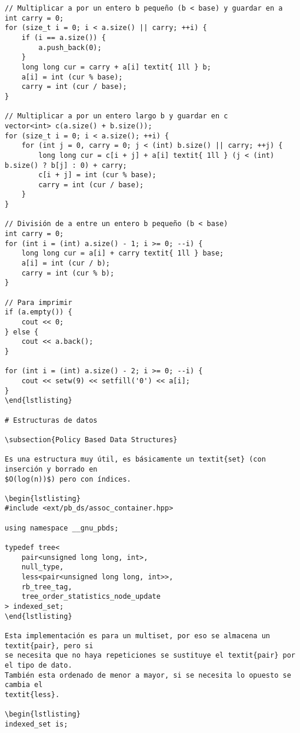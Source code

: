 \documentclass[11pt]{article}
\begin{document}
\begin{verbatim}
// Multiplicar a por un entero b pequeño (b < base) y guardar en a
int carry = 0;
for (size_t i = 0; i < a.size() || carry; ++i) {
    if (i == a.size()) {
        a.push_back(0);
    }
    long long cur = carry + a[i] textit{ 1ll } b;
    a[i] = int (cur % base);
    carry = int (cur / base);
}

// Multiplicar a por un entero largo b y guardar en c
vector<int> c(a.size() + b.size());
for (size_t i = 0; i < a.size(); ++i) {
    for (int j = 0, carry = 0; j < (int) b.size() || carry; ++j) {
        long long cur = c[i + j] + a[i] textit{ 1ll } (j < (int) b.size() ? b[j] : 0) + carry;
        c[i + j] = int (cur % base);
        carry = int (cur / base);
    }
}

// División de a entre un entero b pequeño (b < base)
int carry = 0;
for (int i = (int) a.size() - 1; i >= 0; --i) {
    long long cur = a[i] + carry textit{ 1ll } base;
    a[i] = int (cur / b);
    carry = int (cur % b);
}

// Para imprimir
if (a.empty()) {
    cout << 0;
} else {
    cout << a.back();
}
        
for (int i = (int) a.size() - 2; i >= 0; --i) {
    cout << setw(9) << setfill('0') << a[i];
}
\end{lstlisting}

# Estructuras de datos

\subsection{Policy Based Data Structures}

Es una estructura muy útil, es básicamente un textit{set} (con inserción y borrado en
$O(log(n))$) pero con índices.

\begin{lstlisting}
#include <ext/pb_ds/assoc_container.hpp>

using namespace __gnu_pbds;

typedef tree<
    pair<unsigned long long, int>,
    null_type,
    less<pair<unsigned long long, int>>,
    rb_tree_tag,
    tree_order_statistics_node_update
> indexed_set;
\end{lstlisting}

Esta implementación es para un multiset, por eso se almacena un textit{pair}, pero si
se necesita que no haya repeticiones se sustituye el textit{pair} por el tipo de dato.
También esta ordenado de menor a mayor, si se necesita lo opuesto se cambia el
textit{less}.

\begin{lstlisting}
indexed_set is;


\end{verbatim}
\end{document}
